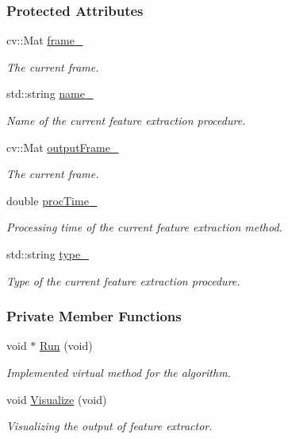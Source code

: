 \subsubsection*{Protected Attributes}
\begin{DoxyCompactItemize}
\item 
cv\-::\-Mat \hyperlink{group___feature_extractor_a585b0dc6e6184422c5563e80bff50ffa}{frame\-\_\-}
\begin{DoxyCompactList}\small\item\em The current frame. \end{DoxyCompactList}\item 
std\-::string \hyperlink{group___feature_extractor_a0e73ef0aed82c04f06b6eeb9a9b9be8b}{name\-\_\-}
\begin{DoxyCompactList}\small\item\em Name of the current feature extraction procedure. \end{DoxyCompactList}\item 
cv\-::\-Mat \hyperlink{group___feature_extractor_a1c7b8087feb05f02b09eb1b536d443e6}{output\-Frame\-\_\-}
\begin{DoxyCompactList}\small\item\em The current frame. \end{DoxyCompactList}\item 
double \hyperlink{group___feature_extractor_a79d60ce90ab8e6ccd66ff8f7da2365c7}{proc\-Time\-\_\-}
\begin{DoxyCompactList}\small\item\em Processing time of the current feature extraction method. \end{DoxyCompactList}\item 
std\-::string \hyperlink{group___feature_extractor_aaf3aef30088cd1be80e1770d0a9d945b}{type\-\_\-}
\begin{DoxyCompactList}\small\item\em Type of the current feature extraction procedure. \end{DoxyCompactList}\end{DoxyCompactItemize}
\subsubsection*{Private Member Functions}
\begin{DoxyCompactItemize}
\item 
void $\ast$ \hyperlink{group___feature_extractor_ad415c0f9a207eb30cedfb750d62731cf}{Run} (void)
\begin{DoxyCompactList}\small\item\em Implemented virtual method for the algorithm. \end{DoxyCompactList}\item 
void \hyperlink{group___feature_extractor_ab39886debe485d200a73b8c8d500544b}{Visualize} (void)
\begin{DoxyCompactList}\small\item\em Visualizing the output of feature extractor. \end{DoxyCompactList}\end{DoxyCompactItemize}


